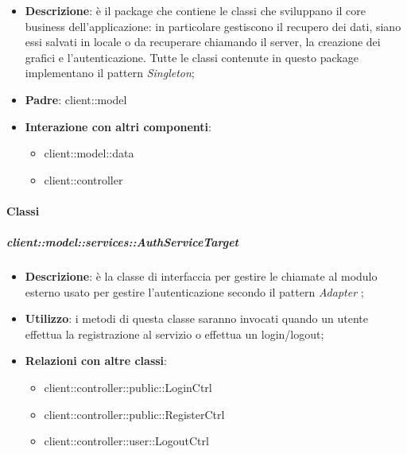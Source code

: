 \begin{itemize}
	\item \textbf{Descrizione}: è il package che contiene le classi che sviluppano il core business dell'applicazione: in particolare gestiscono il recupero dei dati, siano essi salvati in locale o da recuperare chiamando il server, la creazione dei grafici e l'autenticazione. Tutte le classi contenute in questo package implementano il pattern \emph{Singleton};
	\item \textbf{Padre}: client::model
	\item \textbf{Interazione con altri componenti}:
		\begin{itemize}
			\item client::model::data
			\item client::controller
		\end{itemize}
\end{itemize}

	\paragraph{Classi} %

		\subparagraph{client::model::services::AuthServiceTarget} %
		\label{subp:client_model_services_authservice}
			\begin{itemize}
				\item \textbf{Descrizione}: è la classe di interfaccia per gestire le chiamate al modulo esterno usato per gestire l'autenticazione secondo il pattern \emph{Adapter} ;
				\item \textbf{Utilizzo}: i metodi di questa classe saranno invocati quando un utente effettua la registrazione al servizio o effettua un login/logout;
				\item \textbf{Relazioni con altre classi}:
					\begin{itemize}
						\item client::controller::public::LoginCtrl
						\item client::controller::public::RegisterCtrl
						\item client::controller::user::LogoutCtrl
					\end{itemize}
			\end{itemize}

